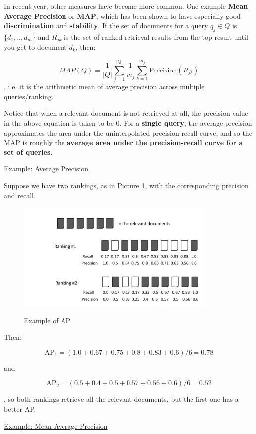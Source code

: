 In recent year, other measures have become more common. One example \textbf{Mean Average Precision} or \textbf{MAP}, which has been shown to have especially good \textbf{discrimination} and \textbf{stability}. If the set of documents for a query $q_j \in Q$ is $\{ d_1, .., d_m \}$ and $R_{jk}$ is the set of ranked retrieval results from the top result until you get to document $d_k$, then:

$$
MAP(Q) = \frac{1}{|Q|} \sum_{j = 1}^{|Q|} \frac{1}{m_j} \sum_{k = 1}^{m_j} \text{Precision}(R_{jk})
$$
, i.e. it is the arithmetic mean of average precision across multiple queries/ranking.

Notice that when a relevant document is not retrieved at all, the precision value in the above equation is taken to be 0. For a \textbf{single query}, the average precision approximates the area under the uninterpolated precision-recall curve, and so the MAP is roughly the \textbf{average area under the precision-recall curve for a set of queries}. 

\underline{Example: Average Precision}

Suppose we have two rankings, as in Picture \ref{ap}, with the corresponding precision and recall.

\begin{figure}[h!]
		\centering
		\includegraphics[scale = 2.0]{img/example AP.jpg}
		\label{ap}
        \caption{Example of AP}
\end{figure}

Then:

$$
\text{AP}_1 = (1.0 + 0.67 + 0.75 + 0.8 + 0.83 + 0.6)/6 = 0.78
$$

and 

$$
\text{AP}_2 = (0.5 + 0.4 + 0.5 + 0.57 + 0.56 + 0.6)/6 = 0.52
$$

, so both rankings retrieve all the relevant documents, but the first one has a better AP.

\underline{Example: Mean Average Precision}

